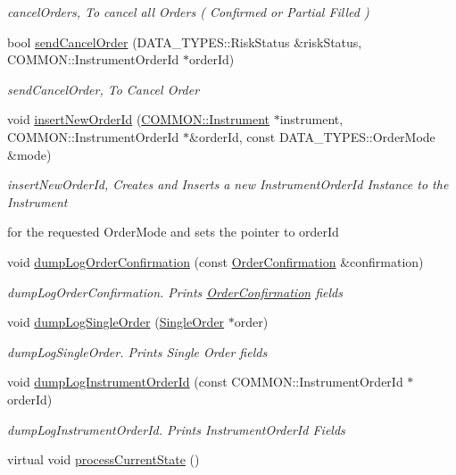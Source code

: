 \begin{DoxyCompactItemize}
\begin{DoxyCompactList}\small\item\em cancel\-Orders, To cancel all Orders ( Confirmed or Partial Filled ) \end{DoxyCompactList}\item 
bool \hyperlink{class_a_p_i2_1_1_s_g_context_a1845d09e0349a9988e9fc1fcb5f31940}{send\-Cancel\-Order} (D\-A\-T\-A\-\_\-\-T\-Y\-P\-E\-S\-::\-Risk\-Status \&risk\-Status, C\-O\-M\-M\-O\-N\-::\-Instrument\-Order\-Id $\ast$order\-Id)
\begin{DoxyCompactList}\small\item\em send\-Cancel\-Order, To Cancel Order \end{DoxyCompactList}\item 
void \hyperlink{class_a_p_i2_1_1_s_g_context_ad77850025e1e3f2b7f1dca5490126190}{insert\-New\-Order\-Id} (\hyperlink{class_a_p_i2_1_1_c_o_m_m_o_n_1_1_instrument}{C\-O\-M\-M\-O\-N\-::\-Instrument} $\ast$instrument, C\-O\-M\-M\-O\-N\-::\-Instrument\-Order\-Id $\ast$\&order\-Id, const D\-A\-T\-A\-\_\-\-T\-Y\-P\-E\-S\-::\-Order\-Mode \&mode)
\begin{DoxyCompactList}\small\item\em insert\-New\-Order\-Id, Creates and Inserts a new Instrument\-Order\-Id Instance to the Instrument \par
 for the requested Order\-Mode and sets the pointer to order\-Id \end{DoxyCompactList}\item 
void \hyperlink{class_a_p_i2_1_1_s_g_context_a6f8f354555be544b381f9553d6ac05f8}{dump\-Log\-Order\-Confirmation} (const \hyperlink{class_a_p_i2_1_1_order_confirmation}{Order\-Confirmation} \&confirmation)
\begin{DoxyCompactList}\small\item\em dump\-Log\-Order\-Confirmation. Prints \hyperlink{class_a_p_i2_1_1_order_confirmation}{Order\-Confirmation} fields \end{DoxyCompactList}\item 
void \hyperlink{class_a_p_i2_1_1_s_g_context_a904408111683cd8301ee1e364cd6011a}{dump\-Log\-Single\-Order} (\hyperlink{class_a_p_i2_1_1_single_order}{Single\-Order} $\ast$order)
\begin{DoxyCompactList}\small\item\em dump\-Log\-Single\-Order. Prints Single Order fields \end{DoxyCompactList}\item 
void \hyperlink{class_a_p_i2_1_1_s_g_context_af669043763cb2f3b9faafd640a6c3557}{dump\-Log\-Instrument\-Order\-Id} (const C\-O\-M\-M\-O\-N\-::\-Instrument\-Order\-Id $\ast$order\-Id)
\begin{DoxyCompactList}\small\item\em dump\-Log\-Instrument\-Order\-Id. Prints Instrument\-Order\-Id Fields \end{DoxyCompactList}\item 
\hypertarget{class_a_p_i2_1_1_s_g_context_a8153eaa080b3a20c8e55a7c018979e0d}{virtual void \hyperlink{class_a_p_i2_1_1_s_g_context_a8153eaa080b3a20c8e55a7c018979e0d}{process\-Current\-State} ()}\label{class_a_p_i2_1_1_s_g_context_a8153eaa080b3a20c8e55a7c018979e0d}


\end{DoxyCompactItemize}
